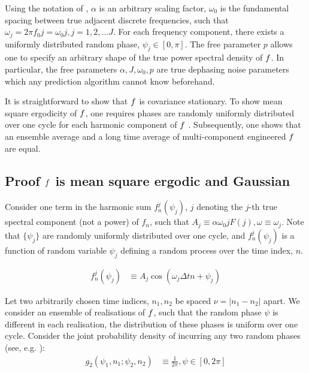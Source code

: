Using the notation of \cite{soare2014}, $\alpha$ is an arbitrary scaling factor, $\omega_0$ is the fundamental spacing between true adjacent discrete frequencies, such that $\omega_j = 2 \pi f_0 j =\omega_0 j, j = 1, 2, ...J$. For each frequency component, there exists a uniformly distributed random phase, $\psi_j \in [0, \pi]$. The free parameter $p$ allows one to specify an arbitrary shape of the true power spectral density of $f$. In particular, the free parameters $\alpha, J, \omega_0, p$ are true dephasing noise parameters which any prediction algorithm cannot know beforehand.

It is straightforward to show that $f$ is covariance stationary. To show mean square ergodicity of $f$, one requires phases are randomly uniformly distributed over one cycle for each harmonic component of $f$ \cite{gelb1974applied}. Subsequently, one shows that an ensemble average and a long time average of multi-component engineered $f$ are equal. 

\subsection{Proof  $f$ is mean square ergodic and Gaussian}

Consider one term in the harmonic sum $f^j_n(\psi_j)$, $j$ denoting the $j$-th true spectral component (not a power) of $f_n$, such that $A_j \equiv \alpha \omega_0 j F(j), \omega \equiv \omega_j$. Note that $\{ \psi_j \}$ are randomly uniformly distributed over one cycle, and $f^j_n(\psi_j)$ is a function of random variable $\psi_j$ defining a random process over the time index, $n$. 

\begin{align}
f^j_n(\psi_j) & \equiv A_j \cos(\omega_j \Delta t n + \psi_j ) 
\end{align}

Let two arbitrarily chosen time indices, $n_1, n_2$ be spaced $\nu = |n_1 - n_2|$ apart. We consider an ensemble of realisations of $f$, such that the random phase $\psi$ is different in each realisation, the distribution of these phases is uniform over one cycle. Consider the joint probability density of incurring any two random phases (see, e.g. \cite{gelb1974applied}):
\begin{align}
g_2(\psi_1, n_1; \psi_2, n_2) & \equiv \frac{1}{2\pi}, \psi \in [0, 2\pi] \label{eqn:SS_ensble_prob_density} \\
\end{align}

